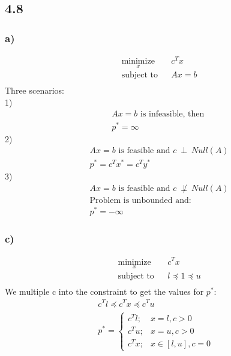 \documentclass[12pt]{article}
\begin{document}
\subsection*{4.8}

\subsubsection*{a)}

\begin{equation*}
\begin{aligned}
& \underset{x}{\text{minimize}}
& & c^Tx\\
& \text{subject to}
& & Ax = b\\
\end{aligned}
\end{equation*}
Three scenarios:\\
1)
\begin{equation*}
\begin{aligned}
& Ax = b \text{ is infeasible, then }\\
& p^* = \infty
\end{aligned}
\end{equation*}
2)
\begin{equation*}
\begin{aligned}
& Ax = b \text{ is feasible and $c\ \perp \ Null(A)$}\\
& p^* = c^Tx^* = c^Ty^*
\end{aligned}
\end{equation*}
3)
\begin{equation*}
\begin{aligned}
& Ax = b \text{ is feasible and $c\ \not\perp\ Null(A)$}\\
& \text{Problem is unbounded and: }\\
& p^* = -\infty
\end{aligned}
\end{equation*}
\subsubsection*{c)}
\begin{equation*}
\begin{aligned}
& \underset{x}{\text{minimize}}
& & c^Tx\\
& \text{subject to}
& & l \preceq 1 \preceq u \\
\end{aligned}
\end{equation*}
We multiple c into the constraint to get the values for $p^*$: 
\begin{equation*}
\begin{aligned}
c^Tl \preceq c^Tx \preceq c^Tu\\
p^* = 
    \begin{cases}
    c^Tl;& x = l, c > 0\\
    c^Tu;& x = u, c > 0\\
    c^Tx;& x \in [l,u], c = 0 
    \end{cases}
\end{aligned}
\end{equation*}
\end{document}
